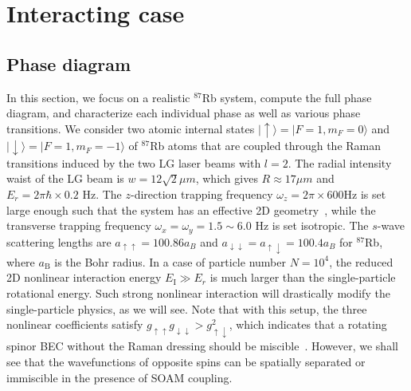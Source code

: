 \documentclass[twocolumn,pra,unsortedaddress,showpacs,floatfix,citeautoscript,nofootinbib]{revtex4-1}
\begin{document}
\vspace{-0.3cm}
\section{Interacting case}
\label{Sec-BEC}
\vspace{-0.3cm}

\subsection{Phase diagram}\vspace{-0.3cm}

In this section, we focus on a realistic $^{87}$Rb system, compute
the full phase diagram, and characterize each individual phase as
well as various phase transitions. We consider two atomic internal
states $|\uparrow \rangle =|F=1,m_{F}=0\rangle $ and $|\downarrow
\rangle =|F=1,m_{F}=-1\rangle $ of $^{87}$Rb atoms that are
coupled through the Raman transitions induced by the two LG laser
beams with $l=2$. The radial intensity waist of the LG beam is
$w=12\sqrt{2}\mu m$, which gives $R\approx 17\mu m$ and
$E_{r}=2\pi \hbar \times 0.2$ ${\text{Hz}}$. The $z$-direction
trapping frequency $\omega _{z}=2\pi \times 600\text{Hz}$ is set
large enough such that the system has an effective 2D
geometry~\cite{Ramanathan2011}, while the transverse trapping
frequency $\omega _{x}=\omega _{y}=1.5\sim 6.0\text{ Hz}$ is set
isotropic. The $s$-wave scattering lengths are
$a_{\uparrow\uparrow}= 100.86 a_{B}$ and
$a_{\downarrow\downarrow}=a_{\uparrow\downarrow}= 100.4 a_{B}$ for
$^{87}$Rb, where $a_{\text{B}}$ is the Bohr radius. In a case of
particle number $N=10^{4}$, the reduced 2D nonlinear interaction
energy $E_{\text{I}}\gg E_{r}$ is much larger than the
single-particle rotational energy. Such strong nonlinear
interaction will drastically modify the single-particle physics,
as we will see. Note that with this setup, the three nonlinear
coefficients satisfy $g_{\uparrow \uparrow }g_{\downarrow
\downarrow }>g_{\uparrow \downarrow }^{2}$, which indicates that a
rotating spinor BEC without the Raman dressing should be
miscible~\cite{Ho1996}. However, we shall see that the
wavefunctions of opposite spins can be spatially separated or
immiscible in the presence of SOAM coupling.
\end{document}
